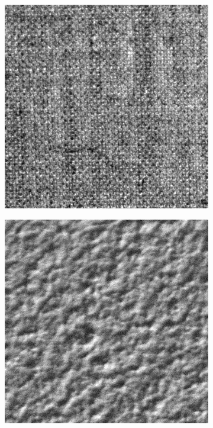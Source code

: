 \begin{figure}[h!]
\begin{subfigure}{.15\textwidth}
  \includegraphics[width=.8\linewidth]{kylberg_examples/canvas1_003.png}
\end{subfigure}
\begin{subfigure}{.15\textwidth}
  \centering
  \includegraphics[width=.8\linewidth]{kylberg_examples/ceiling1_003.png}
\end{subfigure}%
\begin{subfigure}{.15\textwidth}
  \centering

\end{subfigure}
\end{figure}
